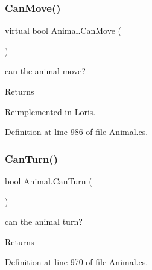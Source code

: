 \mbox{\label{class_animal_a50a5002837a408f0032cc6d84ba60d1e}} 
\subsubsection{\texorpdfstring{Can\+Move()}{CanMove()}}
{\footnotesize\ttfamily virtual bool Animal.\+Can\+Move (\begin{DoxyParamCaption}{ }\end{DoxyParamCaption})\hspace{0.3cm}{\ttfamily [virtual]}}



can the animal move? 

\begin{DoxyReturn}{Returns}

\end{DoxyReturn}


Reimplemented in \mbox{\hyperlink{class_loris_a58dcb13392476fa95e7f9f26c5f46ce6}{Loris}}.



Definition at line 986 of file Animal.\+cs.

\mbox{\label{class_animal_a4fe2d98f1c17c588fc8f3dc8c1667972}} 
\subsubsection{\texorpdfstring{Can\+Turn()}{CanTurn()}}
{\footnotesize\ttfamily bool Animal.\+Can\+Turn (\begin{DoxyParamCaption}{ }\end{DoxyParamCaption})}



can the animal turn? 

\begin{DoxyReturn}{Returns}

\end{DoxyReturn}


Definition at line 970 of file Animal.\+cs.

\mbox{\label{class_animal_a70c9a4ffd82a76ec8665f99646858399}} 

